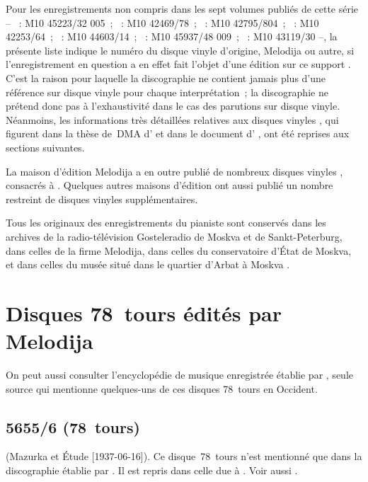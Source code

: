Pour les enregistrements non compris dans les sept volumes publiés de cette
série -- ~: M10 45223/32 005~; ~: M10 42469/78~;
~: M10 42795/804~; ~: M10 42253/64~; ~: M10
44603/14~; ~: M10 45937/48 009~; ~: M10 43119/30 --,
la présente liste indique le numéro du disque vinyle d'origine, Melodija ou
autre, si l'enregistrement en question a en effet fait l'objet d'une édition
sur ce support \citep[voir][]{Malik, Masuda, Nikonovich11, Rossi, White}.
C'est la raison pour laquelle la discographie ne contient jamais plus d'une
référence sur disque vinyle pour chaque interprétation~; la discographie ne
prétend donc pas à l'exhaustivité dans le cas des parutions sur disque
vinyle.
Néanmoins, les informations très détaillées relatives aux disques vinyles
, qui figurent dans la thèse de~DMA d'\EWhite{}
\citep[voir][p.~83-94]{White} et dans le document d'\INikonovich{}
\citep[voir][p.~\hbox{1-5}]{Nikonovich11}, ont été reprises aux sections
suivantes.

La maison d'édition Melodija a en outre publié de nombreux disques vinyles
, consacrés à \VSofronitsky{} \citep[voir][]{Malik, Masuda,
Nikonovich11, Recordssu, Rockdisco, Rossi, White}.
Quelques autres maisons d'édition ont aussi publié un nombre restreint de
disques vinyles supplémentaires.

Tous les originaux des enregistrements du pianiste sont conservés dans les
archives de la radio-télévision Gosteleradio de Moskva et de
Sankt-Peterburg, dans celles de la firme Melodija, dans celles du
conservatoire d'\hbox{État} de Moskva, et dans celles du musée \Scriabine{}
situé dans le quartier d'\hbox{Arbat} à Moskva
\citep[voir][p.~11]{Nikonovich11}.

\section{Disques 78~tours édités par Melodija}

On peut aussi consulter l'encyclopédie de musique enregistrée établie par
\citet{CloughCuming}, seule source qui mentionne quelques-uns de ces disques
78~tours en Occident.

\subsection{5655/6 (78~tours)}

\Chopin{} (Mazurka   et Étude  
[1937-06-16]).
Ce disque~78~tours n'est mentionné que dans la discographie établie par
\citet[p.~1]{Nikonovich11}.
Il est repris dans celle due à \citet[p.~65]{Malik}.
Voir aussi \citet[p.~375]{Scriabine}.

